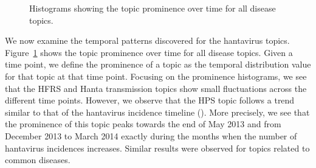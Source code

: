 \documentclass[twoside,leqno,twocolumn]{article}
\begin{document}
\begin{figure}
\begin{center}
\end{center}
\caption{Histograms showing the topic prominence over time for all disease topics.}
\label{fig:topics_timelines}
\end{figure}


We now examine the temporal patterns discovered for the hantavirus topics. Figure~\ref{fig:topics_timelines} shows the topic prominence over time for all disease topics. Given a time point, we define the prominence of a topic as the temporal distribution value for that topic at that time point. Focusing on the prominence histograms, we see that the HFRS and Hanta transmission topics show small fluctuations across the different time points. However, we observe that the HPS topic follows a trend similar to that of the hantavirus incidence timeline (). More precisely, we see that the prominence of this topic peaks towards the end of May 2013 and from December 2013 to March 2014 exactly during the months when the number of hantavirus incidences increases. Similar results were observed for topics related to common diseases. 
\end{document}
